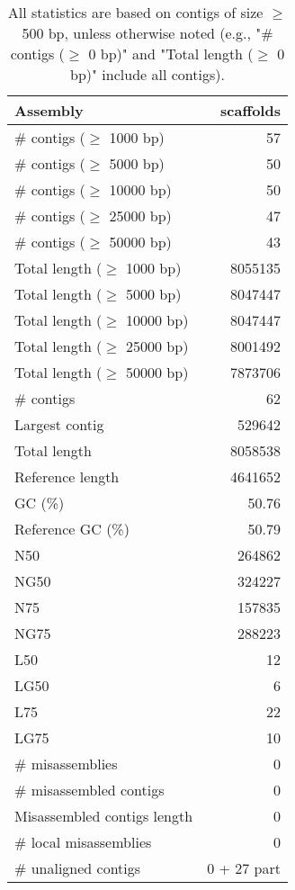 \documentclass[12pt,a4paper]{article}
\begin{document}
\begin{table}[ht]
\begin{center}
\caption{All statistics are based on contigs of size $\geq$ 500 bp, unless otherwise noted (e.g., "\# contigs ($\geq$ 0 bp)" and "Total length ($\geq$ 0 bp)" include all contigs).}
\begin{tabular}{|l*{1}{|r}|}
\hline
Assembly & scaffolds \\ \hline
\# contigs ($\geq$ 1000 bp) & 57 \\ \hline
\# contigs ($\geq$ 5000 bp) & 50 \\ \hline
\# contigs ($\geq$ 10000 bp) & 50 \\ \hline
\# contigs ($\geq$ 25000 bp) & 47 \\ \hline
\# contigs ($\geq$ 50000 bp) & 43 \\ \hline
Total length ($\geq$ 1000 bp) & 8055135 \\ \hline
Total length ($\geq$ 5000 bp) & 8047447 \\ \hline
Total length ($\geq$ 10000 bp) & 8047447 \\ \hline
Total length ($\geq$ 25000 bp) & 8001492 \\ \hline
Total length ($\geq$ 50000 bp) & 7873706 \\ \hline
\# contigs & 62 \\ \hline
Largest contig & 529642 \\ \hline
Total length & 8058538 \\ \hline
Reference length & 4641652 \\ \hline
GC (\%) & 50.76 \\ \hline
Reference GC (\%) & 50.79 \\ \hline
N50 & 264862 \\ \hline
NG50 & 324227 \\ \hline
N75 & 157835 \\ \hline
NG75 & 288223 \\ \hline
L50 & 12 \\ \hline
LG50 & 6 \\ \hline
L75 & 22 \\ \hline
LG75 & 10 \\ \hline
\# misassemblies & 0 \\ \hline
\# misassembled contigs & 0 \\ \hline
Misassembled contigs length & 0 \\ \hline
\# local misassemblies & 0 \\ \hline
\# unaligned contigs & 0 + 27 part \\ \hline

\end{tabular}
\end{center}
\end{table}
\end{document}
